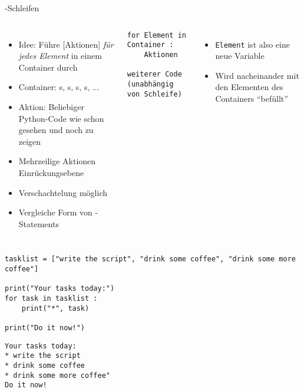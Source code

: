 \begin{frame}[fragile]{-Schleifen}
%
\begin{columns}[T]
\begin{itemize}
\item Idee: Führe [Aktionen] \emph{für jedes Element} in einem Container durch
\item Container: s, s, s, s, ...
\item Aktion: Beliebiger Python-Code wie schon gesehen und noch zu zeigen
\item Mehrzeilige Aktionen \Thus Einrückungsebene
\item Verschachtelung möglich
\item Vergleiche Form von -Statements
\end{itemize}
%
\begin{codebox}
\begin{verbatim}
for Element in Container :
    Aktionen

weiterer Code (unabhängig von Schleife)
\end{verbatim}
\end{codebox}
%
\begin{itemize}
\item \texttt{Element} ist also eine neue Variable
\item Wird nacheinander mit den Elementen des Containers \enquote{befüllt}
\end{itemize}
\end{columns}
%
\end{frame}


\begin{frame}[fragile]
%
\begin{codebox}
\begin{verbatim}
tasklist = ["write the script", "drink some coffee", "drink some more coffee"]

print("Your tasks today:")
for task in tasklist :
    print("*", task)

print("Do it now!")
\end{verbatim}
\end{codebox}
%
\begin{cmdbox}
\begin{verbatim}
Your tasks today:
* write the script
* drink some coffee
* drink some more coffee"
Do it now!
\end{verbatim}
\end{cmdbox}
%
\end{frame}

